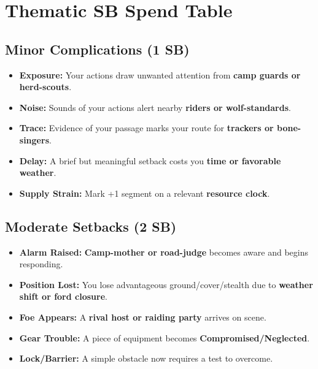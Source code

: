 
\section*{Thematic SB Spend Table}
\label{sec:ykrul-sb}

\subsection*{Minor Complications (1 SB)}
\begin{itemize}
\item \textbf{Exposure:} Your actions draw unwanted attention from \textbf{camp guards or herd-scouts}.
\item \textbf{Noise:} Sounds of your actions alert nearby \textbf{riders or wolf-standards}.
\item \textbf{Trace:} Evidence of your passage marks your route for \textbf{trackers or bone-singers}.
\item \textbf{Delay:} A brief but meaningful setback costs you \textbf{time or favorable weather}.
\item \textbf{Supply Strain:} Mark +1 segment on a relevant \textbf{resource clock}.
\end{itemize}

\subsection*{Moderate Setbacks (2 SB)}
\begin{itemize}
\item \textbf{Alarm Raised:} \textbf{Camp-mother or road-judge} becomes aware and begins responding.
\item \textbf{Position Lost:} You lose advantageous ground/cover/stealth due to \textbf{weather shift or ford closure}.
\item \textbf{Foe Appears:} A \textbf{rival host or raiding party} arrives on scene.
\item \textbf{Gear Trouble:} A piece of equipment becomes \textbf{Compromised/Neglected}.
\item \textbf{Lock/Barrier:} A simple obstacle now requires a test to overcome.
\end{itemize}

